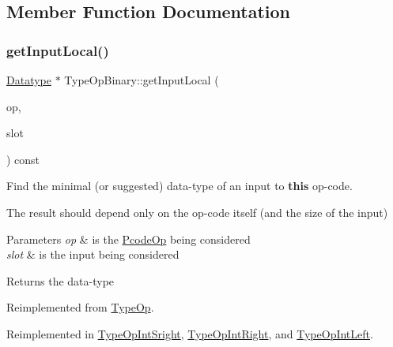 \subsection{Member Function Documentation}
\mbox{\label{class_type_op_binary_a6b8460b8ee0e97579321c6d02fe4fd29}} 
\subsubsection{\texorpdfstring{getInputLocal()}{getInputLocal()}}
{\footnotesize\ttfamily \mbox{\hyperlink{class_datatype}{Datatype}} $\ast$ Type\+Op\+Binary\+::get\+Input\+Local (\begin{DoxyParamCaption}\item[{const \mbox{\hyperlink{class_pcode_op}{Pcode\+Op}} $\ast$}]{op,  }\item[{int4}]{slot }\end{DoxyParamCaption}) const\hspace{0.3cm}{\ttfamily [virtual]}}



Find the minimal (or suggested) data-\/type of an input to {\bfseries{this}} op-\/code. 

The result should depend only on the op-\/code itself (and the size of the input) 
\begin{DoxyParams}{Parameters}
{\em op} & is the \mbox{\hyperlink{class_pcode_op}{Pcode\+Op}} being considered \\
\hline
{\em slot} & is the input being considered \\
\hline
\end{DoxyParams}
\begin{DoxyReturn}{Returns}
the data-\/type 
\end{DoxyReturn}


Reimplemented from \mbox{\hyperlink{class_type_op_abe2e4b619932cf94bafb084963a0fc66}{Type\+Op}}.



Reimplemented in \mbox{\hyperlink{class_type_op_int_sright_a684bdbbed1aa1ac2fc0d08caf5e0ca24}{Type\+Op\+Int\+Sright}}, \mbox{\hyperlink{class_type_op_int_right_afd6976a40304a509b940a874da58b31b}{Type\+Op\+Int\+Right}}, and \mbox{\hyperlink{class_type_op_int_left_ace4697dce938154ffc5098b0c582cf3b}{Type\+Op\+Int\+Left}}.



